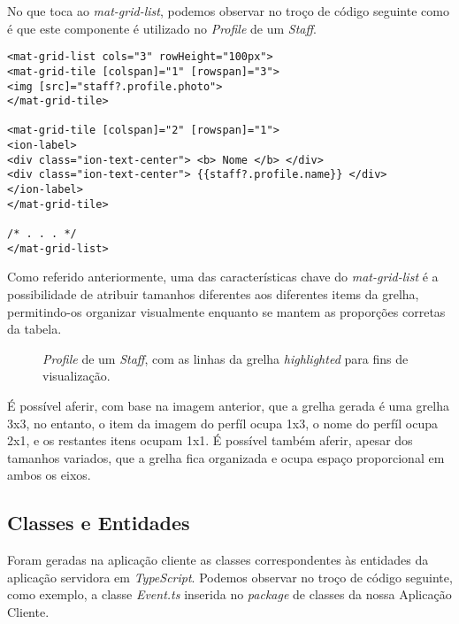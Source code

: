No que toca ao \textit{mat-grid-list}, podemos observar no troço de código seguinte como é que este componente é utilizado no \textit{Profile} de um \textit{Staff}.
\\

\begin{lstlisting}
<mat-grid-list cols="3" rowHeight="100px">
<mat-grid-tile [colspan]="1" [rowspan]="3">
<img [src]="staff?.profile.photo">
</mat-grid-tile>

<mat-grid-tile [colspan]="2" [rowspan]="1">
<ion-label>
<div class="ion-text-center"> <b> Nome </b> </div>
<div class="ion-text-center"> {{staff?.profile.name}} </div>
</ion-label>
</mat-grid-tile>

/* . . . */
</mat-grid-list>

\end{lstlisting}

Como referido anteriormente, uma das características chave do \textit{mat-grid-list} é a possibilidade de atribuir tamanhos diferentes aos diferentes items da grelha, permitindo-os organizar visualmente enquanto se mantem as proporções corretas da tabela. 

\begin{figure}[h]
	\begin{center}
	\end{center}
	\caption{\textit{Profile} de um \textit{Staff}, com as linhas da grelha \textit{highlighted} para fins de visualização. }\label{fig:calendarall}
\end{figure}

É possível aferir, com base na imagem anterior, que a grelha gerada é uma grelha 3x3, no entanto, o item da imagem do perfíl ocupa 1x3, o nome do perfíl ocupa 2x1, e os restantes itens ocupam 1x1. É possível também aferir, apesar dos tamanhos variados, que a grelha fica organizada e ocupa espaço proporcional em ambos os eixos.\\

\subsection{Classes e Entidades}

Foram geradas na aplicação cliente as classes correspondentes às entidades da aplicação servidora em \emph{TypeScript}. Podemos observar no troço de código seguinte, como exemplo, a classe \emph{Event.ts} inserida no \emph{package} de classes da nossa Aplicação Cliente.

